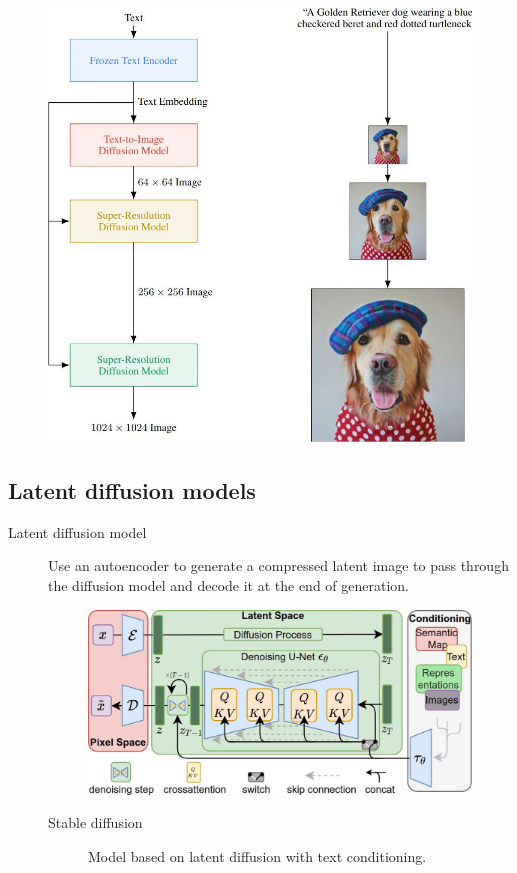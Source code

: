 \begin{description}
\begin{description}
                \begin{figure}[H]
                    \centering
                    \includegraphics[width=0.4\linewidth]{./img/imagen.jpg}
                \end{figure}
        \end{description}
\end{description}


\subsection{Latent diffusion models}

\begin{description}
    \item[Latent diffusion model] 
        Use an autoencoder to generate a compressed latent image to pass through the diffusion model and decode it at the end of generation.

        \begin{figure}[H]
            \centering
            \includegraphics[width=0.55\linewidth]{./img/latent_diffusion.jpg}
        \end{figure}

        \begin{description}
            \item[Stable diffusion] 
                Model based on latent diffusion with text conditioning.
        \end{description}
\end{description}


\let\x\undefined
\let\params\undefined